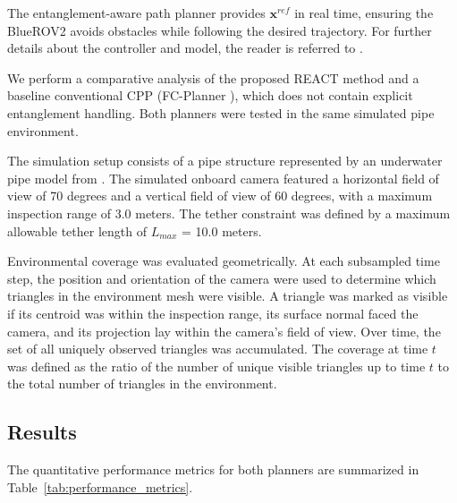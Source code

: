 The entanglement-aware path planner provides $\mathbf{x}^{ref}$ in real time, ensuring the BlueROV2 avoids obstacles while following the desired trajectory. For further details about the controller and model, the reader is referred to \cite{amergp}.

We perform a comparative analysis of the proposed \ac{REACT} method and a baseline conventional \ac{CPP} (FC-Planner \cite{feng2024fc}), which does not contain explicit entanglement handling. Both planners were tested in the same simulated pipe environment.

The simulation setup consists of a pipe structure represented by an underwater pipe model from \cite{feng2024fc}. The simulated onboard camera featured a horizontal field of view of 70 degrees and a vertical field of view of 60 degrees, with a maximum inspection range of 3.0 meters. The tether constraint was defined by a maximum allowable tether length of $L_{max}$ = 10.0 meters.

Environmental coverage was evaluated geometrically. At each subsampled time step, the position and orientation of the camera were used to determine which triangles in the environment mesh were visible. A triangle was marked as visible if its centroid was within the inspection range, its surface normal faced the camera, and its projection lay within the camera's field of view. Over time, the set of all uniquely observed triangles was accumulated. The coverage at time $t$ was defined as the ratio of the number of unique visible triangles up to time $t$ to the total number of triangles in the environment.


\subsection{Results}

The quantitative performance metrics for both planners are summarized in Table~\ref{tab:performance_metrics}.

\begin{table}[ht]
    \centering
    \caption{Performance Metrics Comparison}
    \label{tab:performance_metrics}
    \vspace{0.5em}
\end{table}


